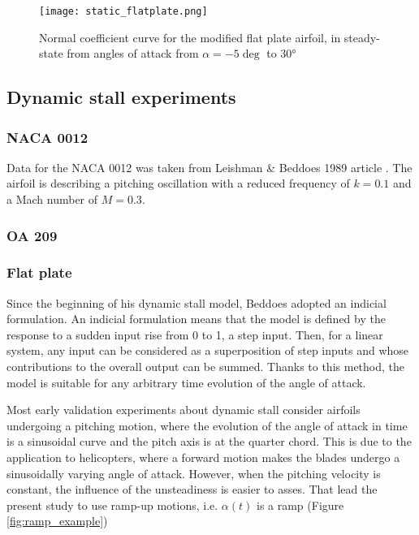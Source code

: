 \begin{figure}[h]
	\centering
	\texttt{[image: static\_flatplate.png]}
	\caption{Normal coefficient curve for the modified flat plate airfoil, in steady-state from angles of attack from $\alpha=-5 \deg$ to $\ang{30}$}
	\label{fig:static_flatplate}
\end{figure}

\subsection{Dynamic stall experiments}

\subsubsection{NACA 0012}

Data for the NACA 0012 was taken from Leishman \& Beddoes 1989 article \cite{leishman_semi-empirical_1989}. The airfoil is describing a pitching oscillation with a reduced frequency of $k=0.1$ and a Mach number of $M=0.3$.

\subsubsection{OA 209}

\subsubsection{Flat plate}

Since the beginning of his dynamic stall model, Beddoes adopted an indicial formulation. An indicial formulation means that the model is defined by the response to a sudden input rise from 0 to 1, a step input. Then, for a linear system, any input can be considered as a superposition of step inputs and whose contributions to the overall output can be summed. Thanks to this method, the model is suitable for any arbitrary time evolution of the angle of attack.

Most early validation experiments about dynamic stall consider airfoils undergoing a pitching motion, where the evolution of the angle of attack in time is a sinusoidal curve and the pitch axis is at the quarter chord. 
This is due to the application to helicopters, where a forward motion makes the blades undergo a sinusoidally varying angle of attack. 
However, when the pitching velocity is constant, the influence of the unsteadiness is easier to asses. That lead the present study to use ramp-up motions, i.e. $\alpha(t)$ is a ramp (Figure \ref{fig:ramp_example})

